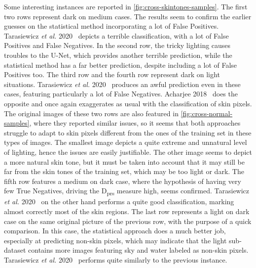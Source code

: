 Some interesting instances are reported in \autoref{fig:cross-skintones-samples}.
The first two rows represent dark on medium cases.
The results seem to confirm the earlier guesses on the statistical method incorporating a lot of False Positives.
Tarasiewicz \textit{et al.} 2020~\cite{tarasiewicz2020skinny} depicts a terrible classification, with a lot of False Positives and False Negatives.
In the second row, the tricky lighting causes troubles to the U-Net, which provides another terrible prediction, while the statistical method has a far better prediction, despite including a lot of False Positives too.
The third row and the fourth row represent dark on light situations.
Tarasiewicz \textit{et al.} 2020~\cite{tarasiewicz2020skinny} produces an awful prediction even in these cases, featuring particularly a lot of False Negatives.
Acharjee 2018~\cite{acharjee2018skin} does the opposite and once again exaggerates as usual with the classification of skin pixels.
The original images of these two rows are also featured in \autoref{fig:cross-normal-samples}, where they reported similar issues, so it seems that both approaches struggle to adapt to skin pixels different from the ones of the training set in these types of images.
The smallest image depicts a quite extreme and unnatural level of lighting, hence the issues are easily justifiable.
The other image seems to depict a more natural skin tone, but it must be taken into account that it may still be far from the skin tones of the training set, which may be too light or dark. 
The fifth row features a medium on dark case, where the hypothesis of having very few True Negatives, driving the D\textsubscript{prs} measure high, seems confirmed.
Tarasiewicz \textit{et al.} 2020~\cite{tarasiewicz2020skinny} on the other hand performs a quite good classification, marking almost correctly most of the skin regions.
The last row represents a light on dark case on the same original picture of the previous row, with the purpose of a quick comparison.
In this case, the statistical approach does a much better job, especially at predicting non-skin pixels, which may indicate that the light sub-dataset contains more images featuring sky and water labeled as non-skin pixels.
Tarasiewicz \textit{et al.} 2020~\cite{tarasiewicz2020skinny} performs quite similarly to the previous instance.

